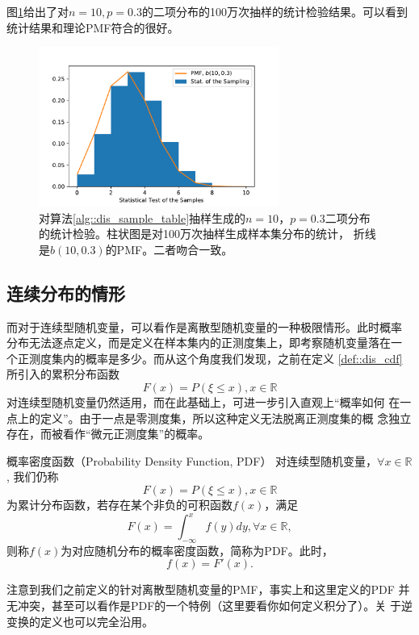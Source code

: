 图\ref{fig::dis_bin_stat}给出了对$n = 10, p = 0.3$的二项分布的100万次抽样的统计检验结果。可以看到统计结果和理论PMF符合的很好。

\begin{figure}[!ht]
\centering
\includegraphics[width=0.7\textwidth]{images/test_bin.pdf}
\caption{对算法\ref{alg::dis_sample_table}抽样生成的$n = 10$，$p =
  0.3$二项分布的统计检验。柱状图是对100万次抽样生成样本集分布的统计，
  折线是$b(10, 0.3)$的PMF。二者吻合一致。}
\label{fig::dis_bin_stat}
\end{figure}


\subsection{连续分布的情形}
而对于连续型随机变量，可以看作是离散型随机变量的一种极限情形。此时概率
分布无法逐点定义，而是定义在样本集内的正测度集上，即考察随机变量落在一
个正测度集内的概率是多少。而从这个角度我们发现，之前在定义
\ref{def::dis_cdf}所引入的累积分布函数
$$
F(x) = P(\xi \leq x), x \in \mathbb{R}
$$
对连续型随机变量仍然适用，而在此基础上，可进一步引入直观上``概率如何
在一点上的定义''。由于一点是零测度集，所以这种定义无法脱离正测度集的概
念独立存在，而被看作``微元正测度集''的概率。

\begin{definition} {\hei 概率密度函数（Probability Density Function, PDF）}
  对连续型随机变量，$\forall x \in \mathbb{R}$, 我们仍称
  \begin{equation}
    F(x) = P(\xi \leq x), x \in \mathbb{R}
    \label{eq::df}
  \end{equation}
  为累计分布函数，若存在某个非负的可积函数$f(x)$，满足
  \begin{equation}
    F(x) = \int_{-\infty}^x f(y) dy, \forall x \in \mathbb{R},
    \label{eq::pdf}
  \end{equation}
  则称$f(x)$为对应随机分布的概率密度函数，简称为PDF。此时，
  \begin{equation}
    f(x) = F'(x).
    \label{eq::pdf2cdf}
  \end{equation}
  \label{def::pdf}
\end{definition}
注意到我们之前定义的针对离散型随机变量的PMF，事实上和这里定义的PDF
并无冲突，甚至可以看作是PDF的一个特例（这里要看你如何定义积分了）。关
于逆变换的定义也可以完全沿用。

